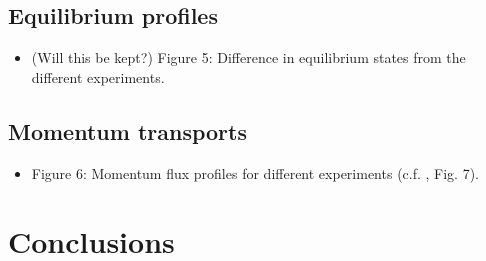 \documentclass[11pt,a4paper]{article}
\begin{document}
\subsection{Equilibrium profiles}
\begin{itemize}
    \item (Will this be kept?) Figure 5: Difference in equilibrium states from the different experiments. 
\end{itemize}

\subsection{Momentum transports}
\begin{itemize}
    \item Figure 6: Momentum flux profiles for different experiments (c.f. \cite{RE2001}, Fig. 7).
\end{itemize}
\section{Conclusions}

\newpage
\printbibliography[title={References}]
\end{document}
